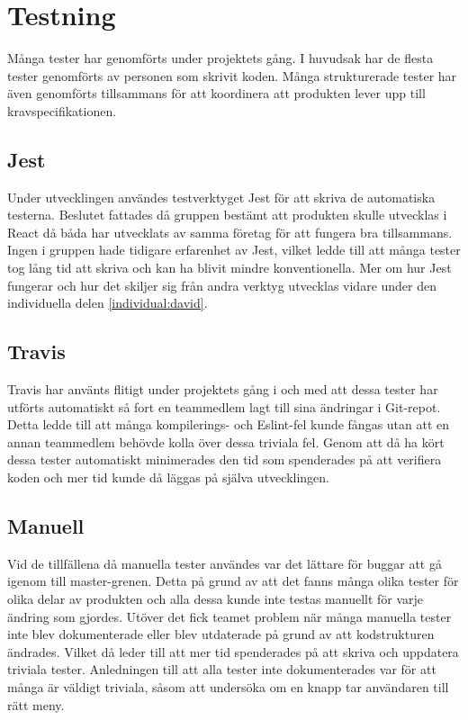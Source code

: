 \section{Testning}
Många tester har genomförts under projektets gång. I huvudsak har de flesta tester genomförts av personen som skrivit koden. Många strukturerade tester har även genomförts tillsammans för att koordinera att produkten lever upp till kravspecifikationen.

\subsection{Jest}
Under utvecklingen användes testverktyget Jest för att skriva de automatiska testerna. Beslutet fattades då gruppen bestämt att produkten skulle utvecklas i React då båda har utvecklats av samma företag för att fungera bra tillsammans. Ingen i gruppen hade tidigare erfarenhet av Jest, vilket ledde till att många tester tog lång tid att skriva och kan ha blivit mindre konventionella. Mer om hur Jest fungerar och hur det skiljer sig från andra verktyg utvecklas vidare under den individuella delen \ref{individual:david}.

\subsection{Travis}
Travis har använts flitigt under projektets gång i och med att dessa tester har utförts automatiskt så fort en teammedlem lagt till sina ändringar i Git-repot. Detta ledde till att många kompilerings- och Eslint-fel kunde fångas utan att en annan teammedlem behövde kolla över dessa triviala fel. Genom att då ha kört dessa tester automatiskt minimerades den tid som spenderades på att verifiera koden och mer tid kunde då läggas på själva utvecklingen.

\subsection{Manuell}
Vid de tillfällena då manuella tester användes var det lättare för buggar att gå igenom till master-grenen. Detta på grund av att det fanns många olika tester för olika delar av produkten och alla dessa kunde inte testas manuellt för varje ändring som gjordes. Utöver det fick teamet problem när många manuella tester inte blev dokumenterade eller blev utdaterade på grund av att kodstrukturen ändrades. Vilket då leder till att mer tid spenderades på att skriva och uppdatera triviala tester. Anledningen till att alla tester inte dokumenterades var för att många är väldigt triviala, såsom att undersöka om en knapp tar användaren till rätt meny.
